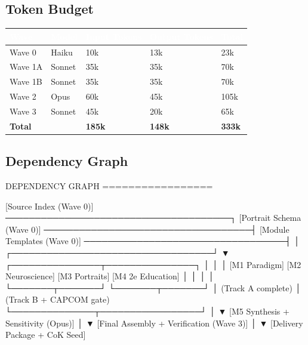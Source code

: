 \documentclass[11pt,letterpaper]{article}
\newcommand{\tableheader}[1]{\textbf{\sffamily\textcolor{white}{#1}}}
\begin{document}
\subsection{Token Budget}

\begin{center}
\begin{tabularx}{\textwidth}{L{3cm}L{2cm}C{2.5cm}C{2.5cm}C{2.5cm}}
\toprule
{}
\tableheader{Wave} & \tableheader{Model} & \tableheader{Input Tokens} & \tableheader{Output Tokens} & \tableheader{Total} \\
\midrule
Wave 0 & Haiku & 10k & 13k & 23k \\
Wave 1A & Sonnet & 35k & 35k & 70k \\
Wave 1B & Sonnet & 35k & 35k & 70k \\
Wave 2 & Opus & 60k & 45k & 105k \\
Wave 3 & Sonnet & 45k & 20k & 65k \\
\midrule
\textbf{Total} & & \textbf{185k} & \textbf{148k} & \textbf{333k} \\
\bottomrule
\end{tabularx}
\end{center}

\subsection{Dependency Graph}

\begin{asciibox}
DEPENDENCY GRAPH
=================

[Source Index (Wave 0)] ──────────────────────────────────────┐
[Portrait Schema (Wave 0)] ───────────────────────────────────┤
[Module Templates (Wave 0)] ──────────────────────────────────┤
                                                               │
                            ┌──────────────────────────────────┘
                            ▼
            ┌───────────────┬───────────────┐
            │               │               │
   [M1 Paradigm]   [M2 Neuroscience]  [M3 Portraits]  [M4 2e Education]
            │               │               │               │
            └───────┬───────┘               └───────┬───────┘
                    │ (Track A complete)             │ (Track B + CAPCOM gate)
                    └──────────────┬─────────────────┘
                                   │
                                   ▼
                         [M5 Synthesis + Sensitivity (Opus)]
                                   │
                                   ▼
                     [Final Assembly + Verification (Wave 3)]
                                   │
                                   ▼
                        [Delivery Package + CoK Seed]
\end{asciibox}
\end{document}
